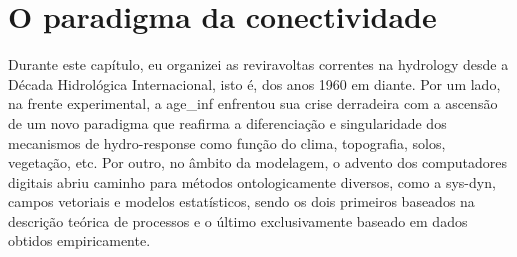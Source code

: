 \documentclass[./main.tex]{subfiles}
\begin{document}
\section{O paradigma da conectividade}

\par Durante este capítulo, eu organizei as reviravoltas correntes na \gls{hydrology} desde a Década Hidrológica Internacional, isto é, dos anos 1960 em diante. Por um lado, na frente experimental, a \gls{age_inf} enfrentou sua crise derradeira com a ascensão de um novo \gls{paradigma} que reafirma a diferenciação e singularidade dos mecanismos de \gls{hydro-response} como função do clima, topografia, solos, vegetação, etc. Por outro, no âmbito da modelagem, o advento dos computadores digitais abriu caminho para métodos ontologicamente diversos, como a \gls{sys-dyn}, campos vetoriais e modelos estatísticos, sendo os dois primeiros baseados na descrição teórica de processos e o último exclusivamente baseado em dados obtidos empiricamente.
\end{document}
